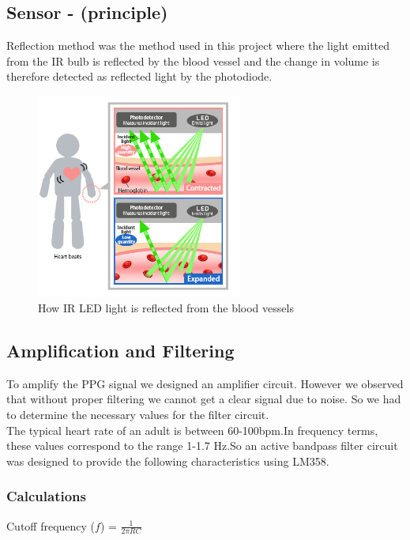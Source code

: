 \documentclass[12pt]{article}
\begin{document}
{	\subsection{Sensor - (principle)}
	\label{sec:ppg}
	Reflection method was the method used in this project where the light emitted from the IR bulb is reflected by the blood vessel and the change in volume is therefore detected as reflected light by the photodiode.
	
	\begin{figure}[!htbp]  %

		\centering
		\includegraphics[width=0.60\textwidth]{sensing.jpg}
		\caption{How IR LED light is reflected from the blood vessels\cite{epson_sensor}}
	\end{figure}


		\subsection{Amplification and Filtering}
		
		To amplify the PPG signal we designed an amplifier circuit. However we observed that without proper filtering we cannot get a clear signal due to noise.
		So we had to determine the necessary values for the filter circuit.\\
		The typical heart rate of an adult is between 60-100bpm\cite{typical_pulse}.In frequency terms, these values correspond to the range 1-1.7 Hz.So an active bandpass filter circuit was designed to provide the following characteristics using LM358.


\subsubsection{Calculations}
\label{sec:4.2.1}
\begin{center}
	Cutoff frequency ($f$) = $\frac{1}{2\pi RC}$
	

\end{center}}
\end{document}
